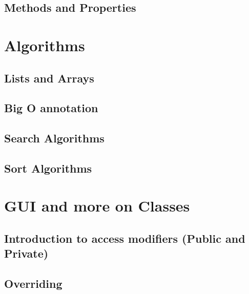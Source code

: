 \documentclass[
]{book}
\begin{document}
\hypertarget{methods-and-properties}{%
\section{Methods and Properties}\label{methods-and-properties}}

\hypertarget{algorithms}{%
\chapter{Algorithms}\label{algorithms}}

\hypertarget{lists-and-arrays}{%
\section{Lists and Arrays}\label{lists-and-arrays}}

\hypertarget{big-o-annotation}{%
\section{Big O annotation}\label{big-o-annotation}}

\hypertarget{search-algorithms}{%
\section{Search Algorithms}\label{search-algorithms}}

\hypertarget{sort-algorithms}{%
\section{Sort Algorithms}\label{sort-algorithms}}

\hypertarget{gui-and-more-on-classes}{%
\chapter{GUI and more on Classes}\label{gui-and-more-on-classes}}

\hypertarget{introduction-to-access-modifiers-public-and-private}{%
\section{Introduction to access modifiers (Public and Private)}\label{introduction-to-access-modifiers-public-and-private}}

\hypertarget{overriding}{%
\section{Overriding}\label{overriding}}
\end{document}
